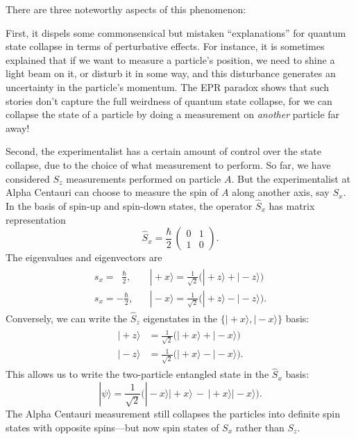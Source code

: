 \documentclass[pra,12pt]{revtex4}
\begin{document}
There are three noteworthy aspects of this phenomenon:

First, it dispels some commonsensical but mistaken ``explanations''
for quantum state collapse in terms of perturbative effects.  For
instance, it is sometimes explained that if we want to measure a
particle's position, we need to shine a light beam on it, or disturb
it in some way, and this disturbance generates an uncertainty in the
particle's momentum.  The EPR paradox shows that such stories don't
capture the full weirdness of quantum state collapse, for we can
collapse the state of a particle by doing a measurement on
\textit{another} particle far away!

Second, the experimentalist has a certain amount of control over the
state collapse, due to the choice of what measurement to perform.  So
far, we have considered $S_z$ measurements performed on particle $A$.
But the experimentalist at Alpha Centauri can choose to measure the
spin of $A$ along another axis, say $S_x$.  In the basis of spin-up
and spin-down states, the operator $\hat{S}_x$ has matrix
representation
\begin{equation}
  \hat{S}_x = \frac{\hbar}{2}\, \begin{pmatrix}0&1\\1&0\end{pmatrix}.
  \end{equation}
The eigenvalues and eigenvectors are
\begin{align}
  \begin{aligned}s_x = \;\;\frac{\hbar}{2},\; &\;\;\; |\!+\!x\rangle = \frac{1}{\sqrt{2}}\Big(|\!+\!z\rangle + |\!-\!z\rangle\Big) \\ s_x = -\frac{\hbar}{2}, &\;\;\; |\!-\!x\rangle = \frac{1}{\sqrt{2}}\Big(|\!+\!z\rangle - |\!-\!z\rangle\Big).\end{aligned}
\end{align}
Conversely, we can write the $\hat{S}_z$ eigenstates in the $\{|\!+\!x\rangle,|\!-\!x\rangle\}$ basis:
\begin{align}
  \begin{aligned}|\!+\!z\rangle &= \frac{1}{\sqrt{2}}\Big(|\!+\!x\rangle + |\!-\!x\rangle\Big) \\ |\!-\!z\rangle &= \frac{1}{\sqrt{2}}\Big(|\!+\!x\rangle - |\!-\!x\rangle\Big).\end{aligned}
\end{align}
This allows us to write the two-particle entangled state in the
$\hat{S}_x$ basis:
\begin{equation}
  |\psi\rangle = \frac{1}{\sqrt{2}} \Big(|\!-\!x\rangle|\!+\!x\rangle \,-\, |\!+\!x\rangle|\!-\!x\rangle\Big).
\end{equation}
The Alpha Centauri measurement still collapses the particles into
definite spin states with opposite spins---but now spin states of
${S}_x$ rather than ${S}_z$.
\end{document}
